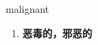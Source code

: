 
\begin{frame}
{\huge malignant}
\begin{center}
\begin{enumerate}\Large
  \item \textbf{恶毒的，邪恶的}
\end{enumerate}
\end{center}
\end{frame}
